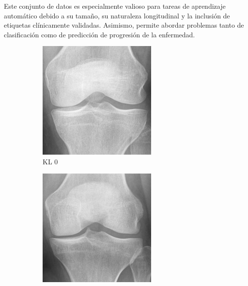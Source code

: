 \documentclass[11pt,spanish,listoffigures,listoftables]{tfgetsinf}
\begin{document}
Este conjunto de datos es especialmente valioso para tareas de aprendizaje automático debido a su tamaño, su naturaleza longitudinal y la inclusión de etiquetas clínicamente validadas. Asimismo, permite abordar problemas tanto de clasificación como de predicción de progresión de la enfermedad.

\begin{figure}[htbp]
    \centering
    \begin{subfigure}[b]{0.19\textwidth}
        \includegraphics[width=\textwidth]{knee_0.png}
        \caption{KL 0}
        \label{fig:knee0}
    \end{subfigure}
    \hfill
    \begin{subfigure}[b]{0.19\textwidth}
        \includegraphics[width=\textwidth]{knee_1.png}

\end{subfigure}
\end{figure}
\end{document}
